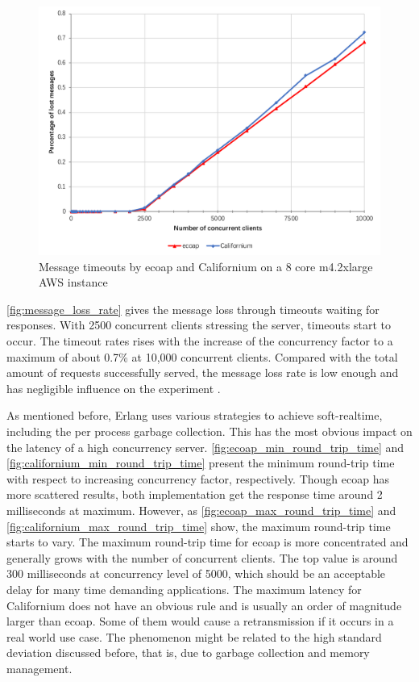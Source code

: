 \begin{figure}[!htbp]
\centering
\includegraphics[scale = 0.8]{message_loss_rate}
\caption{Message timeouts by ecoap and Californium on a 8 core m4.2xlarge AWS instance}
\label{fig:message_loss_rate}
\end{figure}

\autoref{fig:message_loss_rate} gives the message loss through timeouts waiting for responses. With 2500 concurrent clients stressing the server, timeouts start to occur. The timeout rates rises with the increase of the concurrency factor to a maximum of about 0.7\% at 10,000 concurrent clients. Compared with the total amount of requests successfully served, the message loss rate is low enough and has negligible influence on the experiment . 

As mentioned before, Erlang uses various strategies to achieve soft-realtime, including the per process garbage collection. This has the most obvious impact on the latency of a high concurrency server. \autoref{fig:ecoap_min_round_trip_time} and \autoref{fig:californium_min_round_trip_time} present the minimum round-trip time with respect to increasing concurrency factor, respectively. Though ecoap has more scattered results, both implementation get the response time around 2 milliseconds at maximum. However, as \autoref{fig:ecoap_max_round_trip_time} and \autoref{fig:californium_max_round_trip_time} show, the maximum round-trip time starts to vary.
The maximum round-trip time for ecoap is more concentrated and generally grows with the number of concurrent clients. The top value is around 300 milliseconds at concurrency level of 5000, which should be an acceptable delay for many time demanding applications. The maximum latency for Californium does not have an obvious rule and is usually an order of magnitude larger than ecoap. Some of them would cause a retransmission if it occurs in a real world use case. The phenomenon might be related to the high standard deviation discussed before, that is, due to garbage collection and memory management. 

